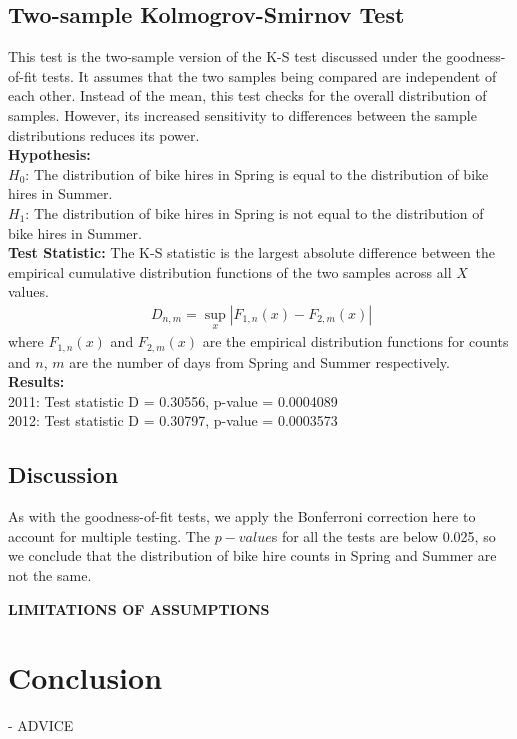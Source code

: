 \subsection{Two-sample Kolmogrov-Smirnov Test}
This test is the two-sample version of the K-S test discussed under the goodness-of-fit tests. It assumes that the two samples being compared are independent of each other. Instead of the mean, this test checks for the overall distribution of samples. However, its increased sensitivity to differences between the sample distributions reduces its power.\\
\textbf{Hypothesis:} ~\\
$H_0$: The distribution of bike hires in Spring is equal to the distribution of bike hires in Summer. \\
$H_1$: The distribution of bike hires in Spring is not equal to the distribution of bike hires in Summer. \\
\textbf{Test Statistic:}
The K-S statistic is the largest absolute difference between the empirical cumulative distribution functions of the two samples across all $X$ values.
\begin{eqnarray}
\ D_{n,m} = \sup_{x} |F_{1,n}(x)-F_{2,m}(x)|
\end{eqnarray}
where $F_{1,n}(x)$ and $F_{2,m}(x)$ are the empirical distribution functions for counts and $n$, $m$ are the number of days from Spring and Summer respectively. \\
\textbf{Results:} ~\\
2011: Test statistic D = 0.30556, p-value = 0.0004089 \\
2012: Test statistic D = 0.30797, p-value = 0.0003573

\subsection{Discussion}
As with the goodness-of-fit tests, we apply the Bonferroni correction here to account for multiple testing. The $p-value$s for all the tests are below 0.025, so we conclude that the distribution of bike hire counts in Spring and Summer are not the same.

\textbf{LIMITATIONS OF ASSUMPTIONS}

\section{Conclusion}
- ADVICE

